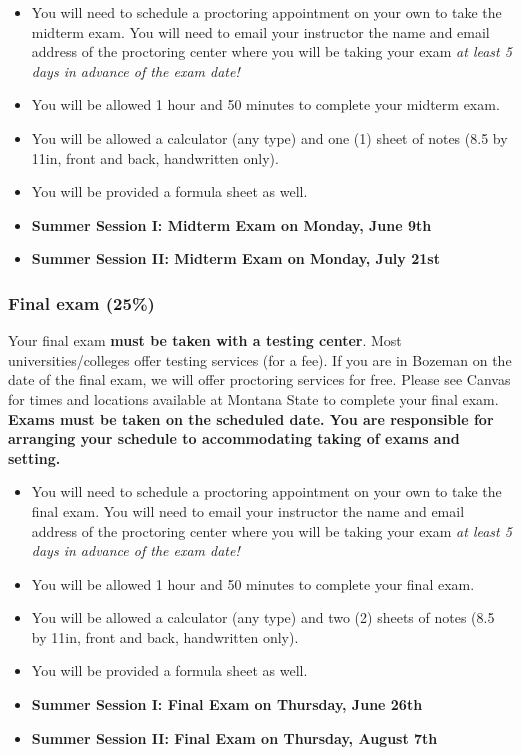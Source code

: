 \documentclass[
]{article}
\providecommand{\tightlist}{%
  \setlength{\itemsep}{0pt}\setlength{\parskip}{0pt}}
\begin{document}
\begin{itemize}
\tightlist
\item
  You will need to schedule a proctoring appointment on your own to take
  the midterm exam. You will need to email your instructor the name and
  email address of the proctoring center where you will be taking your
  exam \emph{at least 5 days in advance of the exam date!}
\item
  You will be allowed 1 hour and 50 minutes to complete your midterm
  exam.\\
\item
  You will be allowed a calculator (any type) and one (1) sheet of notes
  (8.5 by 11in, front and back, handwritten only).
\item
  You will be provided a formula sheet as well.
\item
  \textbf{Summer Session I: Midterm Exam on Monday, June 9th}
\item
  \textbf{Summer Session II: Midterm Exam on Monday, July 21st}
\end{itemize}

\subsubsection{Final exam (25\%)}\label{final-exam-25}

Your final exam \textbf{must be taken with a testing center}. Most
universities/colleges offer testing services (for a fee). If you are in
Bozeman on the date of the final exam, we will offer proctoring services
for free. Please see Canvas for times and locations available at Montana
State to complete your final exam. \textbf{Exams must be taken on the
scheduled date. You are responsible for arranging your schedule to
accommodating taking of exams and setting.}

\begin{itemize}
\tightlist
\item
  You will need to schedule a proctoring appointment on your own to take
  the final exam. You will need to email your instructor the name and
  email address of the proctoring center where you will be taking your
  exam \emph{at least 5 days in advance of the exam date!}
\item
  You will be allowed 1 hour and 50 minutes to complete your final
  exam.\\
\item
  You will be allowed a calculator (any type) and two (2) sheets of
  notes (8.5 by 11in, front and back, handwritten only).
\item
  You will be provided a formula sheet as well.
\item
  \textbf{Summer Session I: Final Exam on Thursday, June 26th}
\item
  \textbf{Summer Session II: Final Exam on Thursday, August 7th}
\end{itemize}
\end{document}
